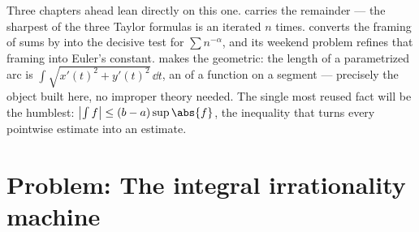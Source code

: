 \begin{remark}
Three chapters ahead lean directly on this one.
 carries the  remainder --- the
sharpest of the three Taylor formulas is an 
iterated $n$ times.  converts the framing of
sums by  into the decisive test for $\sum n^{-\alpha}$,
and its weekend problem refines that framing into Euler's
constant.  makes the  geometric: the
length of a parametrized arc is $\int \sqrt{x'(t)^2 +
y'(t)^2}\,\dd t$, an  of a  function on a
segment --- precisely the object built here, no improper theory
needed. The single most reused fact will be the humblest:
$\bigl|\int f\bigr| \leq (b - a)\sup\abs{f}$, the inequality
that turns every pointwise estimate into an  estimate.
\end{remark}

\section{Problem: The integral irrationality machine}

